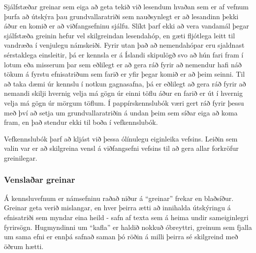 \documentclass[a4paper,12pt,twoside,BCOR=10mm]{scrbook}
\begin{document}
Sjálfstæðar greinar sem eiga að geta tekið við lesendum hvaðan sem er af vefnum þurfa að útskýra þau grundvallaratriði sem nauðsynlegt er að lesandinn þekki áður en komið er að viðfangsefninu sjálfu. Slíkt þarf ekki að vera vandamál þegar sjálfstæða greinin hefur vel skilgreindan lesendahóp, en gæti fljótlega leitt til vandræða í venjulegu námskeiði. Fyrir utan það að nemendahópar eru sjaldnast sérstaklega einsleitir, þá er kennsla er á Íslandi skipulögð svo að hún fari fram í lotum eða misserum þar sem eðlilegt er að gera ráð fyrir að nemendur hafi náð tökum á fyrstu efnisatriðum sem farið er yfir þegar komið er að þeim seinni. Til að taka dæmi úr kennslu í notkun gagnasafna, þá er eðlilegt að gera ráð fyrir að nemandi skilji hvernig velja má gögn úr einni töflu áður en farið er út í hvernig velja má gögn úr mörgum töflum.
Í pappírskennslubók væri gert ráð fyrir þessu með því að setja um grundvallaratriðin á undan þeim sem síðar eiga að koma fram, en það stendur ekki til boða í vefkennslubók.

Vefkennslubók þarf að kljást við þessa ólínulegu eiginleika vefsins. Leiðin sem valin var er að skilgreina vensl á viðfangsefni vefsins til að gera allar forkröfur greinilegar.
\subsubsection{Venslaðar greinar}
Á kennsluvefnum er námsefninu raðað niður á ``greinar'' frekar en blaðsíður. Greinar geta verið mislangar, en hver þeirra ætti að innihalda útskýringu á efnisatriði sem myndar eina heild - safn af texta sem á heima undir sameiginlegri fyrirsögn. Hugmyndinni um ``kafla'' er haldið nokkuð óbreyttri, greinum sem fjalla um sama efni er ennþá safnað saman þó röðin á milli þeirra sé skilgreind með öðrum hætti.
\end{document}
